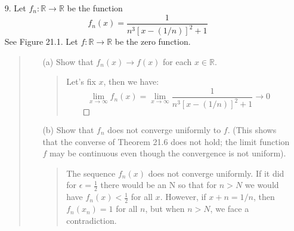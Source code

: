\documentclass[12pt, a4paper]{article}
\newcommand{\reals}{\mathbb{R}} %
\newcommand{\rarr}{\rightarrow}
\begin{document}
\begin{itemize}
\item[]
\item[]

\item[9.]
Let $f_n : \reals \rarr \reals$ be the function
$$f_n(x) = \dfrac{1}{n^3[x - (1/n)]^2 + 1}$$
See Figure 21.1. Let $f : \reals \rarr \reals$ be the zero function.
\begin{quote}
\begin{itemize}
\item[(a)]
Show that $f_n(x) \rarr f(x)$ for each $x \in \reals$.
\begin{quote}
Let's fix $x$, then we have:
$$\displaystyle\lim_{x \rarr \infty}f_n(x) = \lim_{x \rarr \infty}\dfrac{1}{n^3[x - (1/n)]^2 + 1} \rarr 0$$$\qed$
\end{quote}

\item[]

\item[(b)]
Show that $f_n$ does not converge uniformly to $f$. (This shows that the
converse of Theorem 21.6 does not hold; the limit function $f$ may be continuous
even though the convergence is not uniform).
\begin{quote}
The sequence $f_n(x)$ does not converge uniformly. If it did for $\epsilon = \frac{1}{2}$
there would be an N so that for $n > N$ we would have $f_n(x) < \frac{1}{2}$
for all $x$. However, if $x + n = 1/n$, then $f_n(x_n) = 1$ for all $n$, but when $n > N$,
we face a contradiction.
\end{quote}
\end{itemize}
\end{quote}

\end{itemize}
\end{document}
